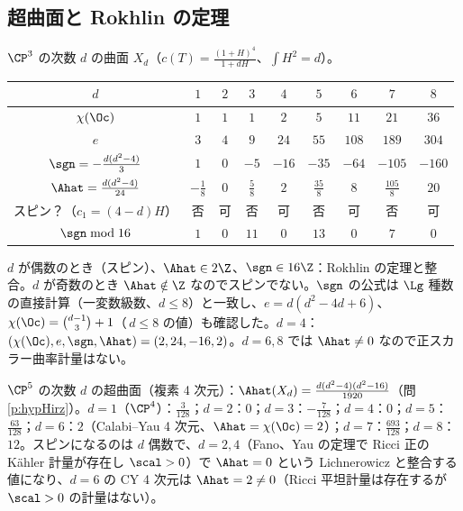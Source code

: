 \subsection{超曲面と Rokhlin の定理}
$\CP^3$ の次数 $d$ の曲面 $X_d$（$c(T)=\frac{(1+H)^4}{1+dH}$、$\int H^2=d$）。
\begin{center}
{\small\begin{tabular}{c|cccccccc}
\toprule
$d$ & $1$ & $2$ & $3$ & $4$ & $5$ & $6$ & $7$ & $8$\\
\midrule
$\chi(\Oc)$ & $1$ & $1$ & $1$ & $2$ & $5$ & $11$ & $21$ & $36$\\
$e$ & $3$ & $4$ & $9$ & $24$ & $55$ & $108$ & $189$ & $304$\\
$\sgn=-\frac{d(d^2-4)}3$ & $1$ & $0$ & $-5$ & $-16$ & $-35$ & $-64$ & $-105$ & $-160$\\
$\Ahat=\frac{d(d^2-4)}{24}$ & $-\frac18$ & $0$ & $\frac58$ & $2$ & $\frac{35}8$ & $8$ & $\frac{105}8$ & $20$\\
スピン？（$c_1=(4-d)H$） & 否 & 可 & 否 & 可 & 否 & 可 & 否 & 可\\
$\sgn\bmod16$ & $1$ & $0$ & $11$ & $0$ & $13$ & $0$ & $7$ & $0$\\
\bottomrule
\end{tabular}}
\end{center}
$d$ が偶数のとき（スピン）、$\Ahat\in2\Z$、$\sgn\in16\Z$：Rokhlin の定理と整合。$d$ が奇数のとき $\Ahat\notin\Z$ なのでスピンでない。$\sgn$ の公式は $\Lg$ 種数の直接計算（一変数級数、$d\le8$）と一致し、$e=d(d^2-4d+6)$、$\chi(\Oc)=\binom{d-1}3+1$（\,$d\le8$ の値）も確認した。$d=4$：$(\chi(\Oc),e,\sgn,\Ahat)=(2,24,-16,2)$。$d=6,8$ では $\Ahat\ne0$ なので正スカラー曲率計量はない。

\medskip
$\CP^5$ の次数 $d$ の超曲面（複素 4 次元）：$\Ahat(X_d)=\frac{d(d^2-4)(d^2-16)}{1920}$（問 \ref{p:hypHirz}）。$d=1$（$\CP^4$）：$\frac{3}{128}$；$d=2$：$0$；$d=3$：$-\frac7{128}$；$d=4$：$0$；$d=5$：$\frac{63}{128}$；$d=6$：$2$（Calabi--Yau 4 次元、$\Ahat=\chi(\Oc)=2$）；$d=7$：$\frac{693}{128}$；$d=8$：$12$。スピンになるのは $d$ 偶数で、$d=2,4$（Fano、Yau の定理で Ricci 正の Kähler 計量が存在し $\scal>0$）で $\Ahat=0$ という Lichnerowicz と整合する値になり、$d=6$ の CY 4 次元は $\Ahat=2\ne0$（Ricci 平坦計量は存在するが $\scal>0$ の計量はない）。

